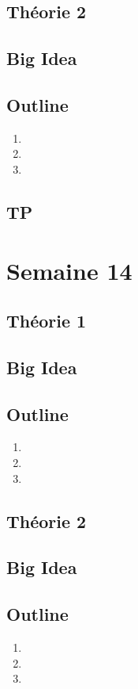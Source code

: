 \documentclass{article}
\begin{document}
\subsection{Théorie 2}
\subsection*{Big Idea}
\subsection*{Outline}
    \begin{enumerate}
    \item
    \item
    \item
    \end{enumerate}
\subsection{TP}

\pagebreak
\section{Semaine 14}
\subsection{Théorie 1}
\subsection*{Big Idea}
\subsection*{Outline}
    \begin{enumerate}
    \item
    \item
    \item
    \end{enumerate}
\subsection{Théorie 2}
\subsection*{Big Idea}
\subsection*{Outline}
    \begin{enumerate}
    \item
    \item
    \item
    \end{enumerate}
\end{document}

